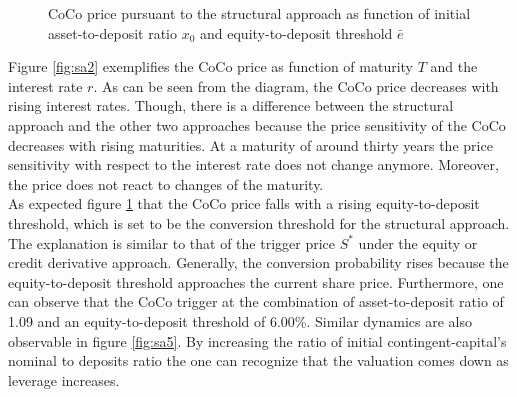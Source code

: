 \begin{figure}[H]
\centering
    \caption[CoCo price pursuant to the structural approach as function of asset-to-deposit ratio and equity-to-deposit threshold]{CoCo price pursuant to the structural approach as function of initial asset-to-deposit ratio $x_0$ and equity-to-deposit threshold $\bar{e}$}
  \label{fig:sa3}
  \end{figure}

Figure \ref{fig:sa2} exemplifies the CoCo price as function of maturity $T$ and the interest rate $r$. As can be seen from the diagram, the CoCo price decreases with rising interest rates. Though, there is a difference between the structural approach and the other two approaches because the price sensitivity of the CoCo decreases with rising maturities. At a maturity of around thirty years the price sensitivity with respect to the interest rate does not change anymore. Moreover, the price does not react to changes of the maturity.\\

As expected figure \ref{fig:sa3} that the CoCo price falls with a rising equity-to-deposit threshold, which is set to be the conversion threshold for the structural approach. The explanation is similar to that of the trigger price $S^*$ under the equity or credit derivative approach. Generally, the conversion probability rises because the equity-to-deposit threshold approaches the current share price. Furthermore, one can observe that the CoCo trigger at the combination of asset-to-deposit ratio of 1.09 and an equity-to-deposit threshold of 6.00\%. Similar dynamics are also observable in figure \ref{fig:sa5}. By increasing the ratio of initial contingent-capital's nominal to deposits ratio the one can recognize that the valuation comes down as leverage increases. 

